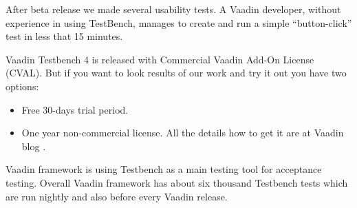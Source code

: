 After beta release we made several usability tests.
A Vaadin developer, without experience in using TestBench, manages to create and 
run a simple ``button-click'' test in less that 15 minutes. 

Vaadin Testbench 4 is released with Commercial Vaadin Add-On License 
(CVAL). But if you want to look results of our work and try it out you have two
options:
\begin{itemize}
  \item Free 30-days trial period.
  \item One year non-commercial license. All the details how to get it are at
  Vaadin blog \cite{vaadinBlog}.
\end{itemize}

Vaadin framework is using Testbench as a main testing tool for acceptance
testing. Overall Vaadin framework has about six thousand Testbench tests which
are run nightly and also before every Vaadin release.
